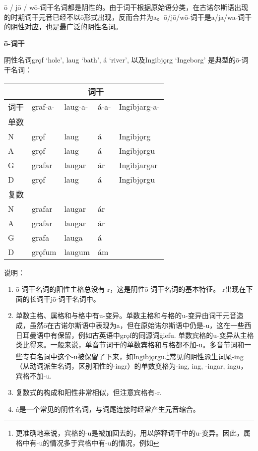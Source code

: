 ō / jō /
wō-词干名词都是阴性的。由于词干根据原始语分类，在古诺尔斯语出现的时期词干元音已经不以ō形式出现，反而合并为a。ō/jō/wō-词干是a/ja/wa-词干的阴性对应，也是最广泛的阴性名词。

\textbf{ō-词干}

阴性名词grǫf `hole', laug `bath', á `river‌', 以及Ingibjǫrg `Ingeborg‌'
是典型的ō-词干名词：

\begin{longtable}{lllll}
  \toprule
       & \multicolumn{4}{c}{词干}                                 \\
  \midrule
  \endhead
  \bottomrule
  \endfoot
  词干 & graf-a-                  & laug-a- & á-a- & Ingibjarg-a- \\
  单数 &                          &         &      &              \\
  N    & grǫf                     & laug    & á    & Ingibjǫrg    \\
  A    & grǫf                     & laug    & á    & Ingibjǫrgu   \\
  G    & grafar                   & laugar  & ár   & Ingibjargar  \\
  D    & grǫf                     & laug    & á    & Ingibjǫrgu   \\
  复数 &                          &         &      &              \\
  N    & grafar                   & laugar  & ár   &              \\
  A    & grafar                   & laugar  & ár   &              \\
  G    & grafa                    & lauga   & á    &              \\
  D    & grǫfum                   & laugum  & ám   &              \\
\end{longtable}

说明：

\begin{enumerate}
  \def\labelenumi{\arabic{enumi})}
  \item
        ō-词干名词的阳性主格总没有-r，这是阴性ō-词干名词的基本特征。-r出现在下面的长词干jō-词干名词中。
  \item
        单数主格、属格和与格中有u-变异。单数主格和与格的u-变异由词干元音造成，虽然ō在古诺尔斯语中表现为a，但在原始诺尔斯语中仍是-u，这在一些西日耳曼语中有保留，例如古英语中grǫf的同源词ġiefu.
        单数宾格的u-变异从主格类比得来。一般来说，单音节词干的单数宾格和与格都不加-u。多音节词和一些专有名词中这个-u被保留了下来，如Ingibjǫrgu.\footnote{更准确地来说，宾格的-u是被加回去的，用以解释词干中的u-变异。因此，属格中有-u的情况多于宾格中有-u的情况，例如}常见的阴性派生词尾-ing（从动词派生名词，区别阳性的-ingr）的单数变格为-ing,
        ing, -ingar, ingu，宾格不加-u.
  \item
        复数式的构成和阳性非常相似，但注意宾格有-r.
  \item
        á是一个常见的阴性名词，与词尾连接时经常产生元音缩合。
\end{enumerate}

